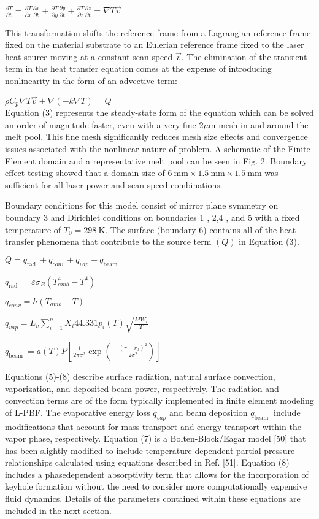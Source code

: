\documentclass[10pt]{article}
\begin{document}
$\frac{\partial T}{\partial t}=\frac{\partial T}{\partial x} \frac{\partial x}{\partial t}+\frac{\partial T}{\partial y} \frac{\partial y}{\partial t}+\frac{\partial T}{\partial z} \frac{\partial z}{\partial t}=\nabla T \vec{v}$

This transformation shifts the reference frame from a Lagrangian reference frame fixed on the material substrate to an Eulerian reference frame fixed to the laser heat source moving at a constant scan speed $\vec{v}$. The elimination of the transient term in the heat transfer equation comes at the expense of introducing nonlinearity in the form of an advective term:

$\rho C_{p} \nabla T \vec{v}+\nabla(-k \nabla T)=Q$\\
Equation (3) represents the steady-state form of the equation which can be solved an order of magnitude faster, even with a very fine $2 \mu \mathrm{m}$ mesh in and around the melt pool. This fine mesh significantly reduces mesh size effects and convergence issues associated with the nonlinear nature of problem. A schematic of the Finite Element domain and a representative melt pool can be seen in Fig. 2. Boundary effect testing showed that a domain size of $6 \mathrm{~mm} \times 1.5 \mathrm{~mm} \times 1.5 \mathrm{~mm}$ was sufficient for all laser power and scan speed combinations.

Boundary conditions for this model consist of mirror plane symmetry on boundary 3 and Dirichlet conditions on boundaries 1 , 2,4 , and 5 with a fixed temperature of $T_{0}=298 \mathrm{~K}$. The surface (boundary 6) contains all of the heat transfer phenomena that contribute to the source term $(Q)$ in Equation (3).

$Q=q_{\text {rad }}+q_{c o n v}+q_{v a p}+q_{\text {beam }}$

$q_{\text {rad }}=\varepsilon \sigma_{B}\left(T_{a m b}^{4}-T^{4}\right)$

$q_{c o n v}=h\left(T_{a m b}-T\right)$

$q_{v a p}=L_{v} \sum_{i=1}^{n} X_{i} 44.331 p_{i}(T) \sqrt{\frac{M W_{i}}{T}}$

$q_{\text {beam }}=a(T) P\left[\frac{1}{2 \pi \sigma^{2}} \exp \left(-\frac{\left(r-r_{0}\right)^{2}}{2 \sigma^{2}}\right)\right]$

Equations (5)-(8) describe surface radiation, natural surface convection, vaporization, and deposited beam power, respectively. The radiation and convection terms are of the form typically implemented in finite element modeling of L-PBF. The evaporative energy loss $q_{v a p}$ and beam deposition $q_{\text {beam }}$ include modifications that account for mass transport and energy transport within the vapor phase, respectively. Equation (7) is a Bolten-Block/Eagar model [50] that has been slightly modified to include temperature dependent partial pressure relationships calculated using equations described in Ref. [51]. Equation (8) includes a phasedependent absorptivity term that allows for the incorporation of keyhole formation without the need to consider more computationally expensive fluid dynamics. Details of the parameters contained within these equations are included in the next section.
\end{document}
